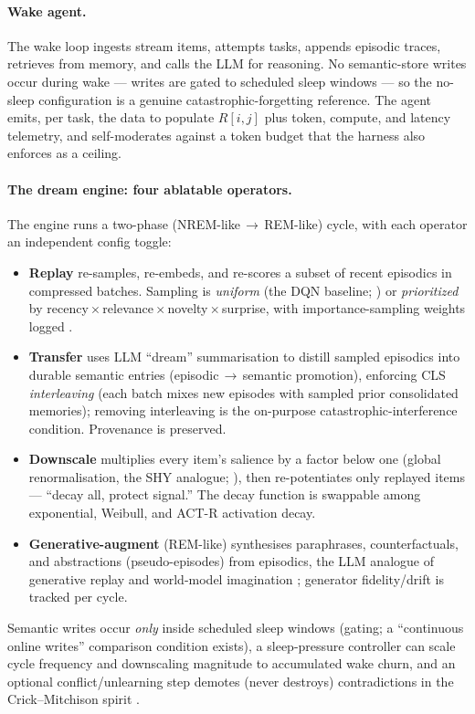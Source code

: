 \paragraph{Wake agent.} The wake loop ingests stream items, attempts tasks,
appends episodic traces, retrieves from memory, and calls the LLM for reasoning.
No semantic-store writes occur during wake --- writes are gated to scheduled
sleep windows --- so the no-sleep configuration is a genuine
catastrophic-forgetting reference. The agent emits, per task, the data to
populate $R[i,j]$ plus token, compute, and latency telemetry, and self-moderates
against a token budget that the harness also enforces as a ceiling.

\paragraph{The dream engine: four ablatable operators.} The engine runs a
two-phase (NREM-like\,$\to$\,REM-like) cycle, with each operator an independent
config toggle:
\begin{itemize}
  \item \textbf{Replay} re-samples, re-embeds, and re-scores a subset of recent
  episodics in compressed batches. Sampling is \emph{uniform} (the DQN baseline;
  \citealp{mnih2015dqn}) or \emph{prioritized} by
  recency\,$\times$\,relevance\,$\times$\,novelty\,$\times$\,surprise, with
  importance-sampling weights logged \citep{schaul2016per}.
  \item \textbf{Transfer} uses LLM ``dream'' summarisation to distill sampled
  episodics into durable semantic entries (episodic\,$\to$\,semantic promotion),
  enforcing CLS \emph{interleaving} (each batch mixes new episodes with sampled
  prior consolidated memories); removing interleaving is the on-purpose
  catastrophic-interference condition. Provenance is preserved.
  \item \textbf{Downscale} multiplies every item's salience by a factor below one
  (global renormalisation, the SHY analogue;
  \citealp{tononi2006shy,tononi2014price}), then re-potentiates only replayed
  items --- ``decay all, protect signal.'' The decay function is swappable among
  exponential, Weibull, and ACT-R activation decay.
  \item \textbf{Generative-augment} (REM-like) synthesises paraphrases,
  counterfactuals, and abstractions (pseudo-episodes) from episodics, the LLM
  analogue of generative replay \citep{shin2017generativereplay} and world-model
  imagination \citep{ha2018worldmodels}; generator fidelity/drift is tracked per
  cycle.
\end{itemize}
Semantic writes occur \emph{only} inside scheduled sleep windows (gating; a
``continuous online writes'' comparison condition exists), a sleep-pressure
controller can scale cycle frequency and downscaling magnitude to accumulated
wake churn, and an optional conflict/unlearning step demotes (never destroys)
contradictions in the Crick--Mitchison spirit \citep{crick1983dreamsleep}.

